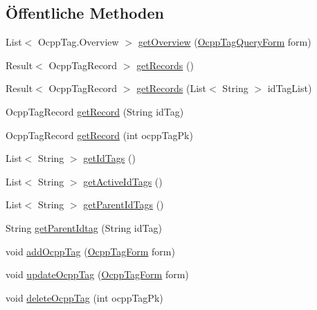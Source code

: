 \subsection*{Öffentliche Methoden}
\begin{DoxyCompactItemize}
\item 
List$<$ Ocpp\-Tag.\-Overview $>$ \hyperlink{interfacede_1_1rwth_1_1idsg_1_1steve_1_1repository_1_1_ocpp_tag_repository_ae80c63f91fbc5c911f0ea3a939406285}{get\-Overview} (\hyperlink{classde_1_1rwth_1_1idsg_1_1steve_1_1web_1_1dto_1_1_ocpp_tag_query_form}{Ocpp\-Tag\-Query\-Form} form)
\item 
Result$<$ Ocpp\-Tag\-Record $>$ \hyperlink{interfacede_1_1rwth_1_1idsg_1_1steve_1_1repository_1_1_ocpp_tag_repository_a3b051f03e81d64f48e5c988a81c86dc7}{get\-Records} ()
\item 
Result$<$ Ocpp\-Tag\-Record $>$ \hyperlink{interfacede_1_1rwth_1_1idsg_1_1steve_1_1repository_1_1_ocpp_tag_repository_aac8b821859efd357c481fab84226f7ca}{get\-Records} (List$<$ String $>$ id\-Tag\-List)
\item 
Ocpp\-Tag\-Record \hyperlink{interfacede_1_1rwth_1_1idsg_1_1steve_1_1repository_1_1_ocpp_tag_repository_a3d218f3abe67946c57af8976c58d206b}{get\-Record} (String id\-Tag)
\item 
Ocpp\-Tag\-Record \hyperlink{interfacede_1_1rwth_1_1idsg_1_1steve_1_1repository_1_1_ocpp_tag_repository_aba9fb2efd7229769c3c198e194eda4dd}{get\-Record} (int ocpp\-Tag\-Pk)
\item 
List$<$ String $>$ \hyperlink{interfacede_1_1rwth_1_1idsg_1_1steve_1_1repository_1_1_ocpp_tag_repository_a7811481285aa81f25bd9bac4445ec0ab}{get\-Id\-Tags} ()
\item 
List$<$ String $>$ \hyperlink{interfacede_1_1rwth_1_1idsg_1_1steve_1_1repository_1_1_ocpp_tag_repository_aeaebdc45f7845e91f98f469197f90f6a}{get\-Active\-Id\-Tags} ()
\item 
List$<$ String $>$ \hyperlink{interfacede_1_1rwth_1_1idsg_1_1steve_1_1repository_1_1_ocpp_tag_repository_a53aa458406fb4dfbbe50e4003e63d00f}{get\-Parent\-Id\-Tags} ()
\item 
String \hyperlink{interfacede_1_1rwth_1_1idsg_1_1steve_1_1repository_1_1_ocpp_tag_repository_a571736e5e6ced39e97f9663ef5bf432f}{get\-Parent\-Idtag} (String id\-Tag)
\item 
void \hyperlink{interfacede_1_1rwth_1_1idsg_1_1steve_1_1repository_1_1_ocpp_tag_repository_a409d49bef677ef120adf82486ec2cff8}{add\-Ocpp\-Tag} (\hyperlink{classde_1_1rwth_1_1idsg_1_1steve_1_1web_1_1dto_1_1_ocpp_tag_form}{Ocpp\-Tag\-Form} form)
\item 
void \hyperlink{interfacede_1_1rwth_1_1idsg_1_1steve_1_1repository_1_1_ocpp_tag_repository_ad0bf42dfe85dce4a3a92fbf908fe74b8}{update\-Ocpp\-Tag} (\hyperlink{classde_1_1rwth_1_1idsg_1_1steve_1_1web_1_1dto_1_1_ocpp_tag_form}{Ocpp\-Tag\-Form} form)
\item 
void \hyperlink{interfacede_1_1rwth_1_1idsg_1_1steve_1_1repository_1_1_ocpp_tag_repository_a1537f5848e9d9ee84d968da3857f1d91}{delete\-Ocpp\-Tag} (int ocpp\-Tag\-Pk)
\end{DoxyCompactItemize}


